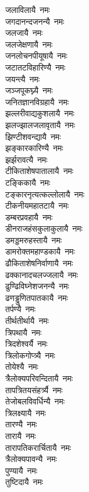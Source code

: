 \begin{multicols}{\maxColumns}
\begin{flushleft}
जलाविलायै~नमः\\
जगदानन्दजनन्यै~नमः\\
जलजायै~नमः\\
जलजेक्षणायै~नमः\hfill{}\\
जनलोचनपीयूषायै~नमः\\
जटातटविहारिण्यै~नमः\\
जयन्त्यै~नमः\\
जञ्जपूकघ्न्यै~नमः\\
जनितज्ञानविग्रहायै~नमः\\
झल्लरीवाद्यकुशलायै~नमः\\
झलज्झालजलावृतायै~नमः\\
झिण्टीशवन्द्यायै~नमः\\
झङ्कारकारिण्यै~नमः\\
झर्झरावत्यै~नमः\hfill{}\\
टीकिताशेषपातालायै~नमः\\
टङ्किकायै~नमः\\
टङ्कारनृत्यत्कल्लोलायै~नमः\\
टीकनीयमहातटायै~नमः\\
डम्बरप्रवहायै~नमः\\
डीनराजहंसकुलाकुलायै~नमः\\
डमड्डमरुहस्तायै~नमः\\
डामरोक्तमहाण्डकायै~नमः\\
ढौकिताशेषनिर्वाणायै~नमः\\
ढक्कानादचलज्जलायै~नमः\hfill{}\\
ढुण्ढिविघ्नेशजनन्यै~नमः\\
ढणड्ढुणितपातकायै~नमः\\
तर्पण्यै~नमः\\
तीर्थतीर्थायै~नमः\\
त्रिपथायै~नमः\\
त्रिदशेश्वर्यै~नमः\\
त्रिलोकगोप्त्र्यै~नमः\\
तोयेश्यै~नमः\\
त्रैलोक्यपरिवन्दितायै~नमः\\
तापत्रितयसंहर्त्र्यै~नमः\hfill{}\\
तेजोबलविवर्धिन्यै~नमः\\
त्रिलक्ष्यायै~नमः\\
तारण्यै~नमः\\
तारायै~नमः\\
तारापतिकरार्चितायै~नमः\\
त्रैलोक्यपावन्यै~नमः\\
पुण्यायै~नमः\\
तुष्टिदायै~नमः\\

\end{flushleft}
\end{multicols}
